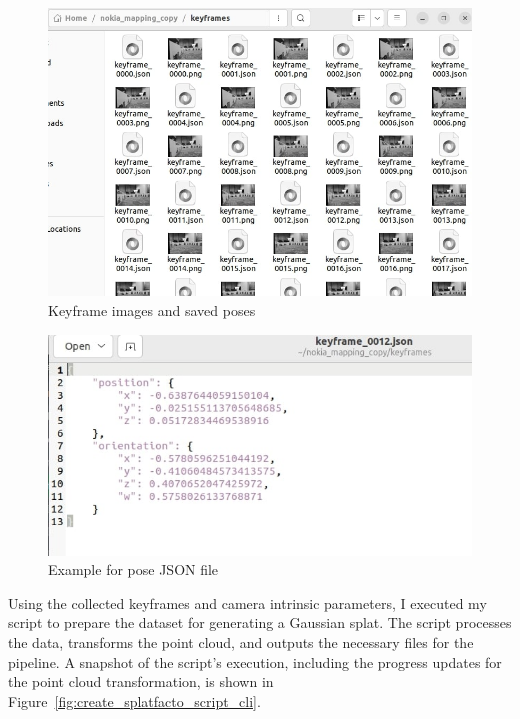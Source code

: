 \begin{figure}[htbp]
	\centering
	\includegraphics[width=150mm, keepaspectratio]{figures_jpg/mapping_keyframe_folder.jpg}
	\caption{Keyframe images and saved poses}
	\label{fig:mapping_keyframe_folder}
\end{figure}

\begin{figure}[htbp]
	\centering
	\includegraphics[width=150mm, keepaspectratio]{figures_jpg/mapping_pose_json.jpg}
	\caption{Example for pose JSON file}
	\label{fig:mapping_pose_json}
\end{figure}

Using the collected keyframes and camera intrinsic parameters, I executed my script to prepare the dataset for generating a Gaussian splat. The script processes the data, transforms the point cloud, and outputs the necessary files for the pipeline. A snapshot of the script's execution, including the progress updates for the point cloud transformation, is shown in Figure~\ref{fig:create_splatfacto_script_cli}.

